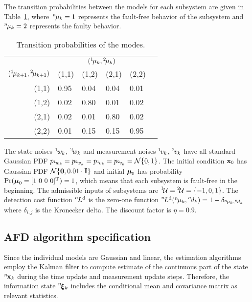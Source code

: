 \documentclass[conference,letterpaper]{IEEEtran}
\def\ist{\prescript{1\!}{}}
\def\iind{\prescript{2\!}{}}
\def\nth{\prescript{n\!}{}}
\begin{document}
The transition probabilities between the models for each subsystem are given in Table~\ref{tab:modeTran}, where~$\nth{\mu}_k=1$ represents the fault-free behavior of the subsystem and~$\nth{\mu}_k=2$ represents the faulty behavior. 
\begin{table}[ht]
\renewcommand{\arraystretch}{1.2}
\centering 
  \caption{Transition probabilities of the modes.}\label{tab:modeTran}
  \begin{tabular}{rlllll}\toprule
     & \multicolumn{4}{c}{$(\ist{\mu}_{k},\iind{\mu}_{k})$}\\
    \cmidrule{2-5}
    $(\ist{\mu}_{k+1},\iind{\mu}_{k+1})$ & (1,1) &  (1,2) & (2,1) & (2,2)\\\midrule 
    (1,1) & 0.95 & 0.04 & 0.04 & 0.01 \\
    (1,2) & 0.02 & 0.80 & 0.01 & 0.02 \\
    (2,1) & 0.02 & 0.01 & 0.80 & 0.02 \\
    (2,2) & 0.01 & 0.15 & 0.15 & 0.95 \\\bottomrule
  \end{tabular}
\end{table}
The state noises $\ist{w_{k}}$, $\iind{w_{k}}$ and measurement noises $\ist{v_{k}}$, $\iind{v_{k}}$ have all standard Gaussian PDF $p_{\ist{w_{k}}}=p_{\iind{w_{k}}}=p_{\ist{v_{k}}}=p_{\iind{v_{k}}} = \mcN\{0,1\}$. 
The initial condition $\mathbf{x}_{0}$ has Gaussian PDF $\mathcal{N}\{\mathbf{0},0.01\cdot\mathbf{I}\}$ and initial $\boldsymbol{\mu}_{0}$ has probability $\Pr(\boldsymbol{\mu}_{0}=[1\ 0\ 0\ 0]^{\text{T}})=1$, which means that each subsystem is fault-free in
the beginning. 
The admissible inputs of subsystems are $\ist{\mcU}=\iind{\mcU} = \{-1,0,1\}$. 
The detection cost function $\nth{L}^{\mathrm{d}}$ is the zero-one function $\nth{L}^{\mathrm{d}}(\nth{\mu}_{k},\nth{d}_{k}) = 1-\delta_{\nth{\mu}_{k},\nth{d}_{k}}$ where $\delta_{i,j}$ is the Kronecker delta. The discount factor is $\eta=0.9$.

\subsection{AFD algorithm specification}\label{sec:AFDAlgorithmSpecification}
Since the individual models are Gaussian and linear, the estimation algorithms employ the Kalman filter to compute estimate of the continuous part of the state $\nth{\bfx}_k$ during the time update and  measurement update steps. 
Therefore, the information state $\nth{\bfxi}_{k}$ includes the conditional mean and covariance matrix as relevant statistics.
\end{document}
